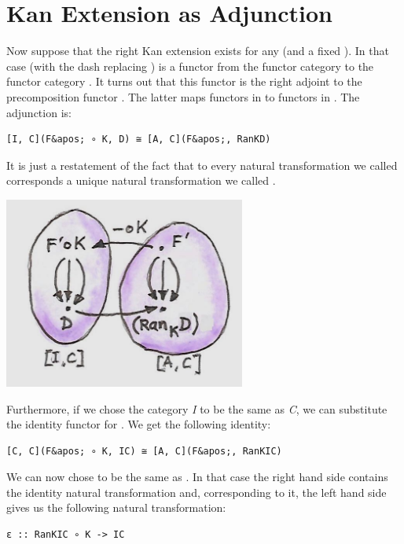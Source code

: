 \section{Kan Extension as
Adjunction}\label{kan-extension-as-adjunction}

Now suppose that the right Kan extension exists for any  (and
a fixed ). In that case  (with the dash
replacing ) is a functor from the functor category
\code{{[}I,\ C{]}} to the functor category \code{{[}A,\ C{]}}. It
turns out that this functor is the right adjoint to the precomposition
functor . The latter maps functors in \code{{[}A,\ C{]}}
to functors in \code{{[}I,\ C{]}}. The adjunction is:

\begin{verbatim}
[I, C](F&apos; ∘ K, D) ≅ [A, C](F&apos;, RanKD)
\end{verbatim}

It is just a restatement of the fact that to every natural
transformation we called  corresponds a unique natural
transformation we called .

\includegraphics[width=3.12500in]{images/kan92.jpg}

Furthermore, if we chose the category \emph{I} to be the same as
\emph{C}, we can substitute the identity functor  for
. We get the following identity:

\begin{verbatim}
[C, C](F&apos; ∘ K, IC) ≅ [A, C](F&apos;, RanKIC)
\end{verbatim}

We can now chose  to be the same as . In
that case the right hand side contains the identity natural
transformation and, corresponding to it, the left hand side gives us the
following natural transformation:

\begin{verbatim}
ε :: RanKIC ∘ K -> IC
\end{verbatim}

